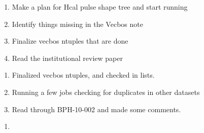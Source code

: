 

\begin{enumerate}
\item Make a plan for Hcal pulse shape tree and start running
\item Identify things missing in the Vecbos note
\item Finalize vecbos ntuples that are done
\item Read the institutional review paper
\end{enumerate}


\begin{enumerate}
\item Finalized vecbos ntuples, and checked in lists.
\item Running a few jobs checking for duplicates in other datasets
\item Read through BPH-10-002 and made some comments.
\end{enumerate}



\begin{enumerate}
\item
\end{enumerate}


